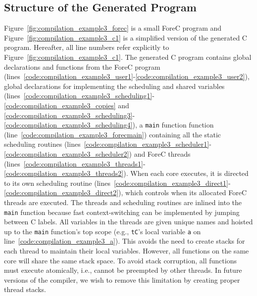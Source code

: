 \subsection{Structure of the Generated Program}
Figure~\ref{fig:compilation_example3_forec} is a small ForeC
program and Figure~\ref{fig:compilation_example3_c1} is a
simplified version of the generated C program. Hereafter, all line
numbers refer explicitly to
Figure~\ref{fig:compilation_example3_c1}.
The generated
C program contains global declarations and functions from the ForeC program
(lines~\ref{code:compilation_example3_user1}-\ref{code:compilation_example3_user2}), 
global declarations for implementing the
scheduling and shared variables 
(lines~\ref{code:compilation_example3_scheduling1}-\ref{code:compilation_example3_copies}
and \ref{code:compilation_example3_scheduling3}-\ref{code:compilation_example3_scheduling4}), 
a \verb$main$ function function (line~\ref{code:compilation_example3_forecmain})
containing all the static scheduling routines 
(lines~\ref{code:compilation_example3_scheduler1}-\ref{code:compilation_example3_scheduler2}) 
and ForeC threads (lines~\ref{code:compilation_example3_threads1}-\ref{code:compilation_example3_threads2}). 
When each core executes, it is directed to its own scheduling routine 
(lines~\ref{code:compilation_example3_direct1}-\ref{code:compilation_example3_direct2}),
which controls when its allocated ForeC threads are
executed. The threads and scheduling routines are inlined
into the \verb$main$ function because fast context-switching can be
implemented by jumping between C labels. All variables in
the threads are given unique names and hoisted up to
the \verb$main$ function's top scope (e.g., \verb$tC$'s local variable
\verb$a$ on line~\ref{code:compilation_example3_a}). 
This avoids the need to create
stacks for each thread to maintain their local variables.
However, all functions on the same core will
share the same stack space. To avoid stack corruption, all
functions must execute atomically, i.e., cannot be preempted
by other threads. In
future versions of the compiler, we wish to remove this
limitation by creating proper thread stacks.

